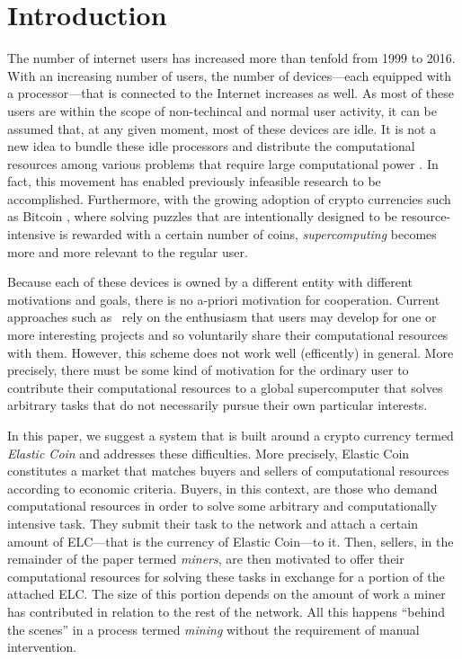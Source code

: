 \documentclass{sig-alternate}
\begin{document}
\section{Introduction}
\label{intro}
The number of internet users has increased more than tenfold from 1999 to 2016.
With an increasing number of users, the number of devices---each equipped with a processor---that is connected to the Internet increases as well.
As most of these users are within the scope of non-techincal and normal user activity, it can be assumed that, at any given moment, most of these devices are idle.
It is not a new idea to bundle these idle processors and distribute the computational resources among various problems that require large computational power \cite{anderson2004boinc,anderson2002seti}. In fact, this movement has enabled previously infeasible research to be accomplished. Furthermore, with the growing adoption of crypto currencies such as Bitcoin \cite{nakamoto2008bitcoin}, where solving puzzles that are intentionally designed to be resource-intensive is rewarded with a certain number of coins, \emph{supercomputing} becomes more and more relevant to the regular user.

Because each of these devices is owned by a different entity with different motivations and goals, there is no a-priori motivation for cooperation.
Current approaches such as~\cite{anderson2004boinc,anderson2002seti} rely on the enthusiasm that users may develop for one or more interesting projects and so voluntarily share their computational resources with them.
However, this scheme does not work well (efficently) in general.
More precisely, there must be some kind of motivation for the ordinary user to contribute their computational resources to a global supercomputer that solves arbitrary tasks that do not necessarily pursue their own particular interests.

In this paper, we suggest a system that is built around a crypto currency termed \emph{Elastic Coin} and addresses these difficulties.
More precisely, Elastic Coin constitutes a market that matches buyers and sellers of computational resources according to economic criteria.
Buyers, in this context, are those who demand computational resources in order to solve some arbitrary and computationally intensive task.
They submit their task to the network and attach a certain amount of ELC---that is the currency of Elastic Coin---to it.
Then, sellers, in the remainder of the paper termed \emph{miners}, are then motivated to offer their computational resources for solving these tasks in exchange for a portion of the attached ELC.
The size of this portion depends on the amount of work a miner has contributed in relation to the rest of the network.
All this happens ``behind the scenes'' in a process termed \emph{mining} without the requirement of manual intervention.
\end{document}
